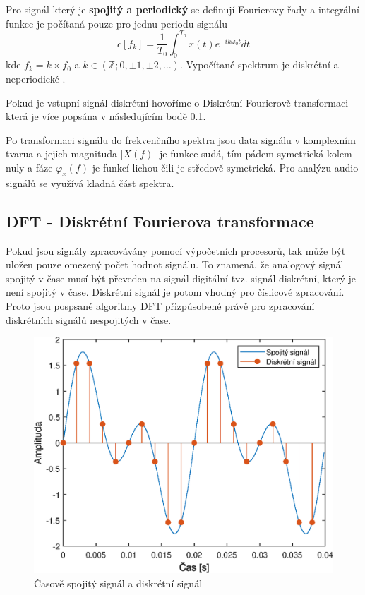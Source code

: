   Pro signál který je \textbf{spojitý a periodický} se definují Fourierovy řady a integrální funkce je počítaná pouze pro jednu periodu signálu
  \begin{equation}
    c[f_k] = \frac{1}{T_0} \int_{0}^{T_0} x(t) e^{-i k \omega_0 t} dt
  \end{equation}
  kde $f_k = k \times f_0$ a $k \in (\mathbb{Z}; 0, \pm 1, \pm 2, \dots)$. Vypočítané spektrum je diskrétní a neperiodické \cite{sneddon1995fourier}.

  Pokud je vstupní signál diskrétní hovoříme o Diskrétní Fourierově transformaci která je více popsána v následujícím bodě \ref{sec:DFT}.

 Po transformaci signálu do frekvenčního spektra jsou data signálu v komplexním tvarua a jejich magnituda $|X(f)|$ je funkce sudá, tím pádem symetrická kolem nuly a fáze $\varphi_x(f)$ je funkcí lichou čili je středově symetrická. Pro analýzu audio signálů se využívá kladná část spektra.

  \subsection{DFT - Diskrétní Fourierova transformace} \label{sec:DFT}

  Pokud jsou signály zpracovávány pomocí výpočetních procesorů,
  tak může být uložen pouze omezený počet hodnot signálu.
  To znamená, že analogový signál spojitý v čase musí být převeden na signál digitální tvz. signál diskrétní, který je není spojitý v čase. 
  Diskrétní signál je potom vhodný pro číslicové zpracování.
  Proto jsou pospsané algoritmy \acs{DFT} přizpůsobené právě pro zpracování diskrétních signálů nespojitých v čase.

  \begin{figure}[H]
    \centering
    \includegraphics[width = 0.8\linewidth]{obrazky/Discrete_signal.eps}
    \caption{Časově spojitý signál a diskrétní signál}
    \label{fig:Discrete_signal}
  \end{figure}

